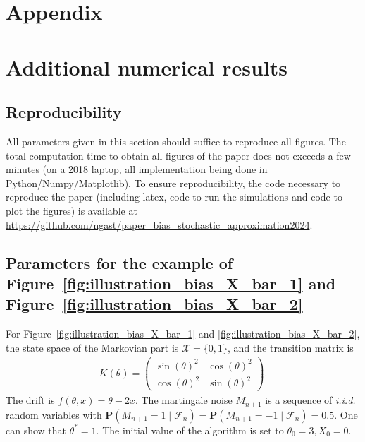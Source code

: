\documentclass{article}
\newcommand{\calX}{\mathcal{X}}
\newcommand{\calF}{\mathcal{F}}
\newcommand\Proba[1]{\mathbf{P}\left(#1\right)}
\begin{document}
\section*{Appendix}

\section{Additional numerical results}
\label{apx:additional_numerical}

\subsection{Reproducibility}

All parameters given in this section should suffice to reproduce all figures.  The total computation time to obtain all figures of the paper does not exceeds a few minutes (on a 2018 laptop, all implementation being done in Python/Numpy/Matplotlib). To ensure reproducibility, the code necessary to reproduce the paper (including latex, code to run the simulations and code to plot the figures) is available at \url{https://github.com/ngast/paper_bias_stochastic_approximation2024}.

\subsection{Parameters for the example of Figure~\ref{fig:illustration_bias_X_bar_1} and Figure~\ref{fig:illustration_bias_X_bar_2}}
\label{apx:additional_numerical_fig1}

For Figure~\ref{fig:illustration_bias_X_bar_1} and \ref{fig:illustration_bias_X_bar_2}, the state space of the Markovian part is $\calX = \{0,1\}$, and the transition matrix is
\begin{align*}
    K(\theta) =
    \begin{pmatrix}
        \sin(\theta)^2 & \cos(\theta)^2 \\
        \cos(\theta)^2 & \sin(\theta)^2
    \end{pmatrix}.    
\end{align*}
The drift is $f(\theta, x)=\theta-2x$. The martingale noise $M_{n+1}$ is a sequence of \emph{i.i.d.} random variables with $\Proba{M_{n+1}=1\mid\calF_n}=\Proba{M_{n+1}=-1\mid\calF_n}=0.5$. One can show that $\theta^*=1$.  The initial value of the algorithm is set to $\theta_0=3, X_0=0$. 
\end{document}
